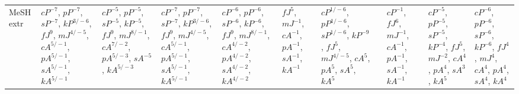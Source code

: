 \documentclass[letterpaper]{article} %
\begin{document}
\begin{sidewaystable*}
\begin{tabular}{l l l l l l l l l l l }
\multirow{10}{1.7cm}{MeSH extr} & \multirow{10}{1.7cm}{$cP^{-7}$, $pP^{-7}$, $sP^{-7}$, $kP^{3/-6}$, $fJ^{9}$, $mJ^{4/-5}$, $cA^{5/-1}$, $pA^{5/-1}$, $sA^{5/-1}$, $kA^{5/-1}$} & \multirow{10}{1.7cm}{$cP^{-5}$, $pP^{-5}$, $sP^{-5}$, $kP^{-5}$, $fJ^{9}$, $mJ^{8/-1}$, $cA^{7/-2}$, $pA^{5/-3}$, $sA^{-5}$, $kA^{5/-3}$} & \multirow{10}{1.7cm}{$cP^{-7}$, $pP^{-7}$, $sP^{-7}$, $kP^{3/-6}$, $fJ^{9}$, $mJ^{4/-5}$, $cA^{5/-1}$, $pA^{5/-1}$, $sA^{5/-1}$, $kA^{5/-1}$} & \multirow{10}{1.7cm}{$cP^{-6}$, $pP^{-6}$, $sP^{-6}$, $kP^{-6}$, $fJ^{9}$, $mJ^{8/-1}$, $cA^{4/-2}$, $pA^{4/-2}$, $sA^{4/-2}$, $kA^{4/-2}$} & \multirow{10}{1.7cm}{$fJ^{5}$, $mJ^{-1}$, $cA^{-1}$, $pA^{-1}$, $sA^{-1}$, $kA^{-1}$} & \multirow{10}{1.7cm}{$cP^{1/-6}$, $pP^{1/-6}$, $sP^{1/-6}$, $kP^{-9}$, $fJ^{5}$, $mJ^{4/-5}$, $cA^{5}$, $pA^{5}$, $sA^{5}$, $kA^{5}$} & \multirow{10}{1.7cm}{} & \multirow{10}{1.7cm}{$cP^{-1}$, $fJ^{6}$, $mJ^{-1}$, $cA^{-1}$, $pA^{-1}$, $sA^{-1}$, $kA^{-1}$} & \multirow{10}{1.7cm}{$cP^{-5}$, $pP^{-5}$, $sP^{-5}$, $kP^{-4}$, $fJ^{5}$, $mJ^{-2}$, $cA^{4}$, $pA^{4}$, $sA^{3}$, $kA^{5}$} & \multirow{10}{1.7cm}{$cP^{-6}$, $pP^{-6}$, $sP^{-6}$, $kP^{-6}$, $fJ^{4}$, $mJ^{4}$, $cA^{4}$, $pA^{4}$, $sA^{4}$, $kA^{4}$} \\ \\ \\ \\ \\ \\ \\ \\ \\ \\
\midrule

\end{tabular}
\end{sidewaystable*}
\end{document}

